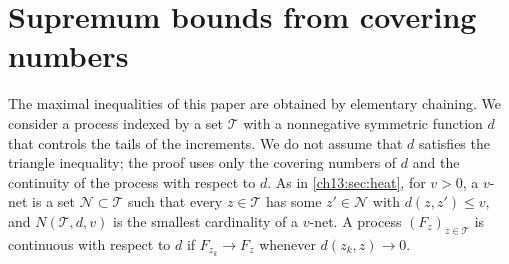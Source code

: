 \section{Supremum bounds from covering numbers}\label{ch13:sec:chaining}

The maximal inequalities of this paper are obtained by elementary chaining. We consider a process indexed by a set $\mathcal T$ with a nonnegative symmetric function $d$ that controls the tails of the increments. We do not assume that $d$ satisfies the triangle inequality; the proof uses only the covering numbers of $d$ and the continuity of the process with respect to $d$. As in \cref{ch13:sec:heat}, for $v>0$, a $v$-net is a set $\mathcal N\subset\mathcal T$ such that every $z\in\mathcal T$ has some $z'\in\mathcal N$ with $d(z,z')\le v$, and $N(\mathcal T,d,v)$ is the smallest cardinality of a $v$-net. A process $(F_z)_{z\in\mathcal T}$ is continuous with respect to $d$ if $F_{z_k}\to F_z$ whenever $d(z_k,z)\to0$.

